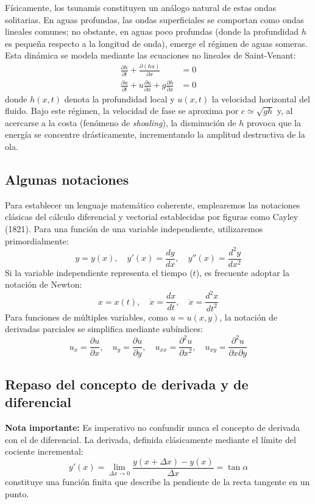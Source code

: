 Físicamente, los tsunamis constituyen un análogo natural de estas ondas solitarias. En aguas profundas, las ondas superficiales se comportan como ondas lineales comunes; no obstante, en aguas poco profundas (donde la profundidad $h$ es pequeña respecto a la longitud de onda), emerge el régimen de aguas someras. Esta dinámica se modela mediante las ecuaciones no lineales de Saint-Venant:
\begin{align*}
    \frac{\partial h}{\partial t} + \frac{\partial (hu)}{\partial x} &= 0 \\
    \frac{\partial u}{\partial t} + u \frac{\partial u}{\partial x} + g \frac{\partial h}{\partial x} &= 0
\end{align*}
donde $h(x,t)$ denota la profundidad local y $u(x,t)$ la velocidad horizontal del fluido. Bajo este régimen, la velocidad de fase se aproxima por $c \simeq \sqrt{gh}$ y, al acercarse a la costa (fenómeno de \textit{shoaling}), la disminución de $h$ provoca que la energía se concentre drásticamente, incrementando la amplitud destructiva de la ola.

\subsection{Algunas notaciones}

Para establecer un lenguaje matemático coherente, emplearemos las notaciones clásicas del cálculo diferencial y vectorial establecidas por figuras como Cayley (1821).
Para una función de una variable independiente, utilizaremos primordialmente:
$$ y = y(x), \quad y'(x) = \frac{dy}{dx}, \quad y''(x) = \frac{d^2y}{dx^2} $$
Si la variable independiente representa el tiempo ($t$), es frecuente adoptar la notación de Newton:
$$ x = x(t), \quad \dot{x} = \frac{dx}{dt}, \quad \ddot{x} = \frac{d^2x}{dt^2} $$
Para funciones de múltiples variables, como $u = u(x,y)$, la notación de derivadas parciales se simplifica mediante subíndices:
$$ u_x = \frac{\partial u}{\partial x}, \quad u_y = \frac{\partial u}{\partial y}, \quad u_{xx} = \frac{\partial^2 u}{\partial x^2}, \quad u_{xy} = \frac{\partial^2 u}{\partial x \partial y} $$

\subsection{Repaso del concepto de derivada y de diferencial}

\textbf{Nota importante:} Es imperativo no confundir nunca el concepto de derivada con el de diferencial. La derivada, definida clásicamente mediante el límite del cociente incremental:
$$ y'(x) = \lim_{\Delta x \to 0} \frac{y(x + \Delta x) - y(x)}{\Delta x} = \tan \alpha $$
constituye una función finita que describe la pendiente de la recta tangente en un punto.

